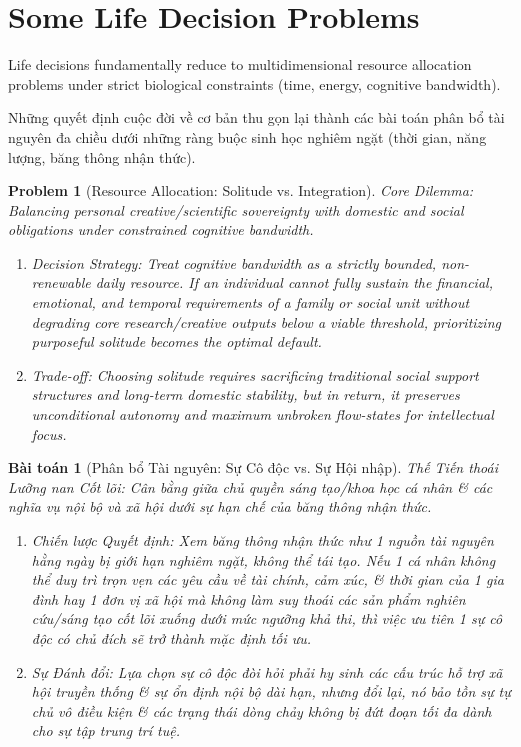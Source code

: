 \documentclass{article}
\newtheorem{problem}{Problem}
\newtheorem{baitoan}{Bài toán}
\begin{document}
\section{Some Life Decision Problems}

Life decisions fundamentally reduce to multidimensional resource allocation problems under strict biological constraints (time, energy, cognitive bandwidth).

Những quyết định cuộc đời về cơ bản thu gọn lại thành các bài toán phân bổ tài nguyên đa chiều dưới những ràng buộc sinh học nghiêm ngặt (thời gian, năng lượng, băng thông nhận thức).

\begin{problem}[Resource Allocation: Solitude vs. Integration]
	\emph{Core Dilemma:} Balancing personal creative/scientific sovereignty with domestic and social obligations under constrained cognitive bandwidth.
	\begin{enumerate}[label=(\roman*)]
		\item \emph{Decision Strategy:} Treat cognitive bandwidth as a strictly bounded, non-renewable daily resource. If an individual cannot fully sustain the financial, emotional, and temporal requirements of a family or social unit without degrading core research/creative outputs below a viable threshold, prioritizing purposeful solitude becomes the optimal default.
		\item \emph{Trade-off:} Choosing solitude requires sacrificing traditional social support structures and long-term domestic stability, but in return, it preserves unconditional autonomy and maximum unbroken flow-states for intellectual focus.
	\end{enumerate}
\end{problem}
\begin{baitoan}[Phân bổ Tài nguyên: Sự Cô độc vs. Sự Hội nhập]
	\emph{Thế Tiến thoái Lưỡng nan Cốt lõi:} Cân bằng giữa chủ quyền sáng tạo/khoa học cá nhân \& các nghĩa vụ nội bộ và xã hội dưới sự hạn chế của băng thông nhận thức.
	\begin{enumerate}[label=(\roman*)]
		\item \emph{Chiến lược Quyết định:} Xem băng thông nhận thức như 1 nguồn tài nguyên hằng ngày bị giới hạn nghiêm ngặt, không thể tái tạo. Nếu 1 cá nhân không thể duy trì trọn vẹn các yêu cầu về tài chính, cảm xúc, \& thời gian của 1 gia đình hay 1 đơn vị xã hội mà không làm suy thoái các sản phẩm nghiên cứu/sáng tạo cốt lõi xuống dưới mức ngưỡng khả thi, thì việc ưu tiên 1 sự cô độc có chủ đích sẽ trở thành mặc định tối ưu.
		\item \emph{Sự Đánh đổi:} Lựa chọn sự cô độc đòi hỏi phải hy sinh các cấu trúc hỗ trợ xã hội truyền thống \& sự ổn định nội bộ dài hạn, nhưng đổi lại, nó bảo tồn sự tự chủ vô điều kiện \& các trạng thái dòng chảy không bị đứt đoạn tối đa dành cho sự tập trung trí tuệ.
	\end{enumerate}
\end{baitoan}
\end{document}
